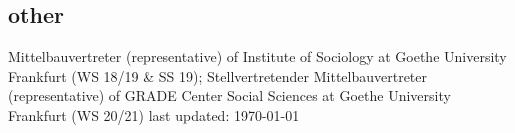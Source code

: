 \documentclass[11pt, a4paper]{article}
\newcommand{\years}[1]{\marginnote{~~#1}}
\begin{document}
\subsection*{other}
Mittelbauvertreter (representative) of Institute of Sociology at Goethe University Frankfurt (WS 18/19 \& SS 19); Stellvertretender Mittelbauvertreter (representative) of GRADE Center Social Sciences at Goethe University Frankfurt (WS 20/21)
\vfill{}
last updated: \today
\end{document}
